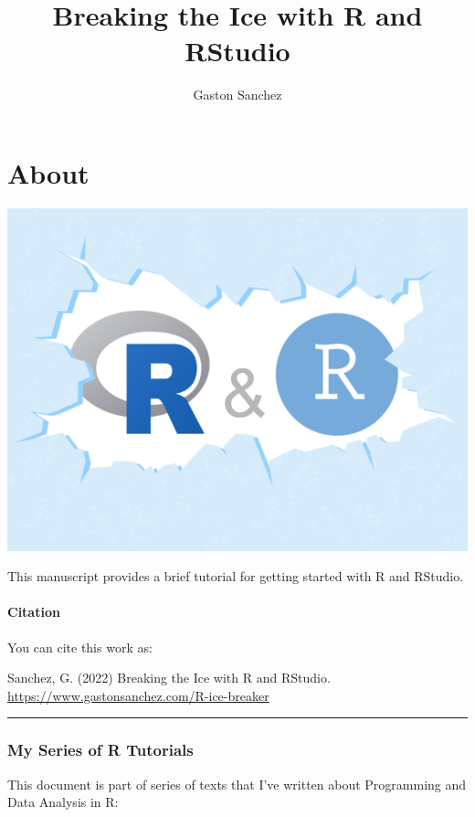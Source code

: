\documentclass[
]{book}
\title{Breaking the Ice with R and RStudio}
\author{Gaston Sanchez}
\date{}
\begin{document}
\maketitle

{
\setcounter{tocdepth}{1}
\tableofcontents
}
\hypertarget{about}{%
\chapter*{About}\label{about}}

\begin{center}\includegraphics[width=0.5\linewidth]{images/R-ice-breaker-cover} \end{center}

This manuscript provides a brief tutorial for getting started with R and
RStudio.

\hypertarget{citation}{%
\subsubsection*{Citation}\label{citation}}

You can cite this work as:

Sanchez, G. (2022) Breaking the Ice with R and RStudio.
\url{https://www.gastonsanchez.com/R-ice-breaker}

\begin{center}\rule{0.5\linewidth}{0.5pt}\end{center}

\hypertarget{my-series-of-r-tutorials}{%
\subsection*{My Series of R Tutorials}\label{my-series-of-r-tutorials}}

This document is part of series of texts that I've written about Programming
and Data Analysis in R:
\end{document}
